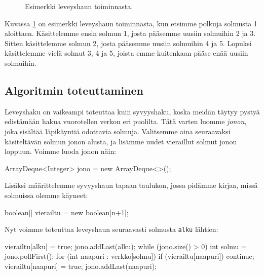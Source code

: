 \begin{figure}
\begin{center}
\end{center}
\caption{Esimerkki leveyshaun toiminnasta.}
\label{fig:levhak}
\end{figure}

Kuvassa \ref{fig:levhak} on esimerkki leveyshaun toiminnasta,
kun etsimme polkuja solmusta 1 aloittaen.
Käsittelemme ensin solmun 1, josta pääsemme uusiin solmuihin 2 ja 3.
Sitten käsittelemme solmun 2, josta pääsemme uusiin solmuihin 4 ja 5.
Lopuksi käsittelemme vielä solmut 3, 4 ja 5,
joista emme kuitenkaan pääse enää uusiin solmuihin.

\subsection{Algoritmin toteuttaminen}

Leveyshaku on vaikeampi toteuttaa kuin syvyyshaku,
koska meidän täytyy pystyä edistämään hakua vuorotellen verkon eri puolilta.
Tätä varten luomme \emph{jonon}, joka sisältää läpikäyntiä odottavia solmuja.
Valitsemme aina seuraavaksi käsiteltävän solmun jonon alusta,
ja lisämme uudet vieraillut solmut jonon loppuun.
Voimme luoda jonon näin:

\begin{code}
ArrayDeque<Integer> jono = new ArrayDeque<>();
\end{code}

Lisäksi määrittelemme syvyyshaun tapaan taulukon, jossa pidämme kirjaa,
missä solmuissa olemme käyneet:

\begin{code}
boolean[] vierailtu = new boolean[n+1];
\end{code}

Nyt voimme toteuttaa leveyshaun seuraavasti solmusta \texttt{alku} lähtien:

\begin{code}
vierailtu[alku] = true;
jono.addLast(alku);
while (jono.size() > 0) {
    int solmu = jono.pollFirst();
    for (int naapuri : verkko[solmu]) {
        if (vierailtu[naapuri]) continue;
        vierailtu[naapuri] = true;
        jono.addLast(naapuri);
    }
}
\end{code}

